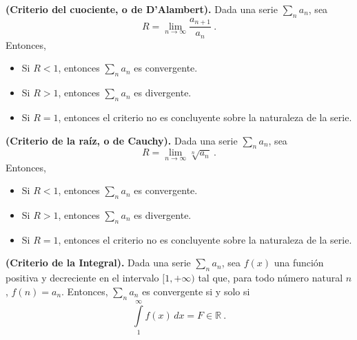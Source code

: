
\begin{teorema}{\textbf{(Criterio del cuociente, o de D'Alambert).}}
    Dada una serie $\sum\limits_n a_n$, sea
    \begin{equation}
        R = \lim_{n \to \infty} \frac{a_{n+1}}{a_n} \ .
    \end{equation}
    Entonces,
    \begin{itemize}
        \item Si $R < 1$, entonces $\sum\limits_n a_n$ es convergente.
        \item Si $R > 1$, entonces $\sum\limits_n a_n$ es divergente.
        \item Si $R = 1$, entonces el criterio no es concluyente sobre la naturaleza de la serie.
    \end{itemize}
\end{teorema}


\begin{teorema}{\textbf{(Criterio de la raíz, o de Cauchy).}}
    Dada una serie $\sum\limits_n a_n$, sea
    \begin{equation}
        R = \lim_{n \to \infty} \sqrt[n]{a_n} \ .
    \end{equation}
    Entonces,
    \begin{itemize}
        \item Si $R < 1$, entonces $\sum\limits_n a_n$ es convergente.
        \item Si $R > 1$, entonces $\sum\limits_n a_n$ es divergente.
        \item Si $R = 1$, entonces el criterio no es concluyente sobre la naturaleza de la serie.
    \end{itemize}
\end{teorema}


\begin{teorema}{\textbf{(Criterio de la Integral).}}
    Dada una serie $\sum\limits_n a_n$, sea $f(x)$ una función positiva y decreciente en el intervalo $[1, +\infty)$ tal que, para todo número natural $n$, $f(n) = a_n$. Entonces, $\sum\limits_n a_n$ es convergente si y solo si 
    \begin{equation}
        \int\limits_1^\infty f(x) \, dx = F \in \mathbb{R} \ .
    \end{equation}
\end{teorema}

